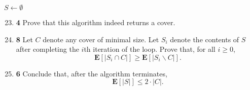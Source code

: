 \documentclass[12pt]{article}
\theoremstyle{plain}
\theoremstyle{definition}
\theoremstyle{remark}
\newcommand{\E}{\textbf{E}}
\newcommand{\pts}[1]{\lbrack\textbf{#1}\rbrack}
\begin{document}
\newpage

\begin{algorithm}
\DontPrintSemicolon
{}
$S\gets\emptyset$\;
\;
\end{algorithm}

\vspace{-10pt}

\begin{enumerate}
\setcounter{enumi}{22}

\item \pts{4} Prove that this algorithm indeed returns a cover.

\begin{comment}\begin{tcolorbox}
Suppose $u$ knows $v$, but $u,v\not\in S$. Then this algorithm will have chosen at least one of $u,v$ will be chosen to be in $S$, contradiction. Thus $S$ is a cover.
\end{tcolorbox}\end{comment}

\item \pts{8} Let $C$ denote any cover of minimal size. Let $S_i$ denote the contents of $S$ after completing the $i$th iteration of the loop. Prove that, for all $i\ge0$, \[\E[|S_i\cap C|]\ge\E[|S_i\backslash C|].\]

\begin{comment}\begin{tcolorbox}
We induct on $i$. For $i=0$, we have $0\ge0$. For general $i$, if one of $u,v$ is in $S$ then $S_{i+1}=S_i$ so we're done. Otherwise, we know at least one of $u,v$ belongs to $C$ as well. Thus, the left-hand side has probability at least $1/2$ of increasing by $1$, whereas the right-hand side has probability at most $1/2$ of increasing by $1$.
\end{tcolorbox}\end{comment}

\item \pts{6} Conclude that, after the algorithm terminates, \[\E[|S|]\le2\cdot|C|.\]

\begin{comment}\begin{tcolorbox}
We have \[\E[|S|]=\E[|S\backslash C|]+\E[|S\cap C|]\le2\cdot\E[|S\cap C|]\le2\cdot|C|.\]
\end{tcolorbox}\end{comment}
\end{enumerate}
\end{document}
